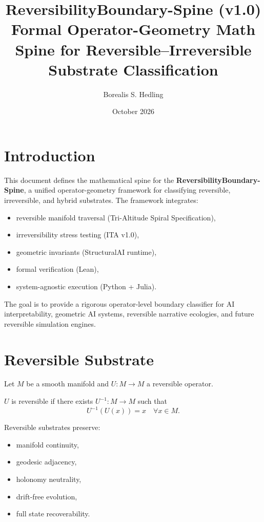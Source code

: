 \documentclass[11pt]{article}
\title{ReversibilityBoundary-Spine (v1.0)\\
\large Formal Operator-Geometry Math Spine for Reversible--Irreversible Substrate Classification}
\author{Borealis S. Hedling}
\date{October 2026}
\begin{document}
\maketitle

\section{Introduction}

This document defines the mathematical spine for the \textbf{ReversibilityBoundary-Spine},
a unified operator-geometry framework for classifying reversible, irreversible, and hybrid
substrates. The framework integrates:

\begin{itemize}
    \item reversible manifold traversal (Tri-Altitude Spiral Specification),
    \item irreversibility stress testing (ITA v1.0),
    \item geometric invariants (StructuralAI runtime),
    \item formal verification (Lean),
    \item system-agnostic execution (Python + Julia).
\end{itemize}

The goal is to provide a rigorous operator-level boundary classifier for AI interpretability,
geometric AI systems, reversible narrative ecologies, and future reversible simulation engines.

\section{Reversible Substrate}

Let $M$ be a smooth manifold and $U : M \to M$ a reversible operator.

\begin{definition}
$U$ is reversible if there exists $U^{-1} : M \to M$ such that
\[
U^{-1}(U(x)) = x \quad \forall x \in M.
\]
\end{definition}

Reversible substrates preserve:

\begin{itemize}
    \item manifold continuity,
    \item geodesic adjacency,
    \item holonomy neutrality,
    \item drift-free evolution,
    \item full state recoverability.
\end{itemize}
\end{document}
